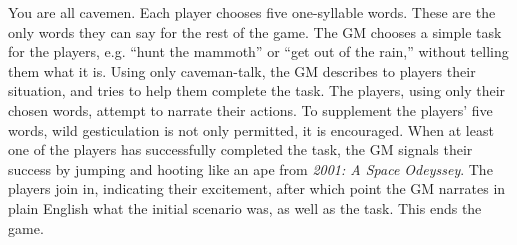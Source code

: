 \documentclass[12pt]{article}
\begin{document}
\maketitle
You are all cavemen.
Each player chooses five one-syllable words.
These are the only words they can say for the rest of the game.
The GM chooses a simple task for the players,
e.g. ``hunt the mammoth''
or ``get out of the rain,'' %
without telling them what it is.
Using only caveman-talk,
the GM describes to players their situation,
and tries to help them complete the task.
The players, using only their chosen words,
attempt to narrate their actions.
To supplement the players' five words,
wild gesticulation is not only permitted,
it is encouraged.
When at least one of the players has successfully completed the task,
the GM signals their success by jumping and hooting
like an ape from \emph{2001: A Space Odeyssey}.
The players join in,
indicating their excitement,
after which point the GM narrates in plain English
what the initial scenario was,
as well as the task.
This ends the game.
\end{document}
